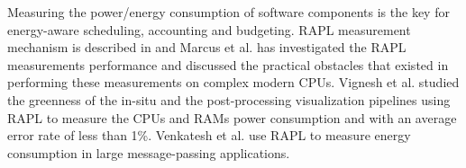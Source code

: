 Measuring the power/energy consumption of software components is the key for energy-aware scheduling, accounting and budgeting. RAPL measurement mechanism is described in\cite{porterfield2015application} and Marcus et al.\cite{hahnel2012measuring} has investigated the RAPL measurements performance and discussed the practical obstacles that existed in performing these measurements on complex modern CPUs. Vignesh et al.\cite{adhinarayanan2015greenness} studied the greenness of the in-situ and the post-processing visualization pipelines using RAPL to measure the CPUs and RAMs power consumption and with an average error rate of less than 1\%. Venkatesh et al.\cite{venkatesh2013evaluation} use RAPL to measure energy consumption in large message-passing applications.

